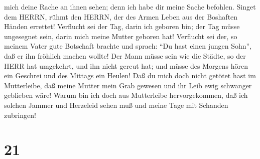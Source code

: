 mich deine Rache an ihnen sehen; denn ich habe dir meine Sache befohlen.
 Singet dem HERRN, rühmt den HERRN, der des Armen Leben aus
der Boshaften Händen errettet!  Verflucht sei der Tag,
darin ich geboren bin; der Tag müsse ungesegnet sein, darin mich meine
Mutter geboren hat!  Verflucht sei der, so meinem Vater
gute Botschaft brachte und sprach: ``Du hast einen jungen Sohn'', daß er
ihn fröhlich machen wollte!  Der Mann müsse sein wie die
Städte, so der HERR hat umgekehrt, und ihn nicht gereut hat; und müsse
des Morgens hören ein Geschrei und des Mittags ein Heulen! 
Daß du mich doch nicht getötet hast im Mutterleibe, daß meine Mutter
mein Grab gewesen und ihr Leib ewig schwanger geblieben wäre!
 Warum bin ich doch aus Mutterleibe hervorgekommen, daß ich
solchen Jammer und Herzeleid sehen muß und meine Tage mit Schanden
zubringen!

\hypertarget{section-20}{%
\section{21}\label{section-20}}

